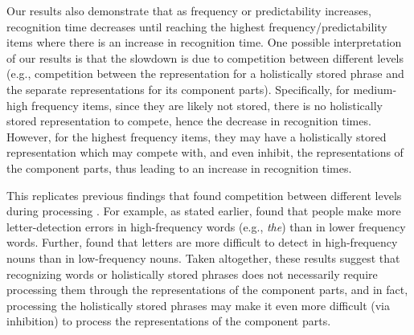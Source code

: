 \documentclass[
  authoryear,
  preprint,
  1p,
  onecolumn]{elsarticle}
\begin{document}
Our results also demonstrate that as frequency or predictability
increases, recognition time decreases until reaching the highest
frequency/predictability items where there is an increase in recognition
time. One possible interpretation of our results is that the slowdown is
due to competition between different levels (e.g., competition between
the representation for a holistically stored phrase and the separate
representations for its component parts). Specifically, for medium-high
frequency items, since they are likely not stored, there is no
holistically stored representation to compete, hence the decrease in
recognition times. However, for the highest frequency items, they may
have a holistically stored representation which may compete with, and
even inhibit, the representations of the component parts, thus leading
to an increase in recognition times.

This replicates previous findings that found competition between
different levels during processing
\citep[e.g.,][]{kapatsinski2009, healy1976, healy1994, minkoff2000}. For
example, as stated earlier, \citet{healy1976} found that people make
more letter-detection errors in high-frequency words (e.g., \emph{the})
than in lower frequency words. Further, \citet{minkoff2000} found that
letters are more difficult to detect in high-frequency nouns than in
low-frequency nouns. Taken altogether, these results suggest that
recognizing words or holistically stored phrases does not necessarily
require processing them through the representations of the component
parts, and in fact, processing the holistically stored phrases may make
it even more difficult (via inhibition) to process the representations
of the component parts.
\end{document}
